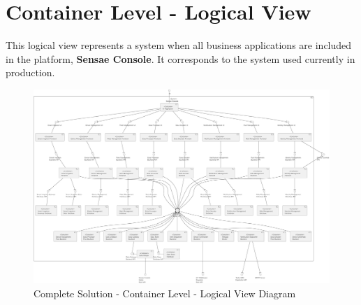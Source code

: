 \chapter{Container Level - Logical View}
\label{AppendixB}

This logical view represents a system when all business applications are included in the platform, \textbf{Sensae Console}. It corresponds to the system used currently in production.

\begin{figure}
   \centering
   \includegraphics[page=1,width=0.8\columnwidth]{assets/diagrams/design/architectural/level2/logical/complete.pdf}
   \caption[Complete Solution - Container Level - Logical View Diagram]{Complete Solution - Container Level - Logical View Diagram}
   \label{fig:AppendixB:complete}
\end{figure}
